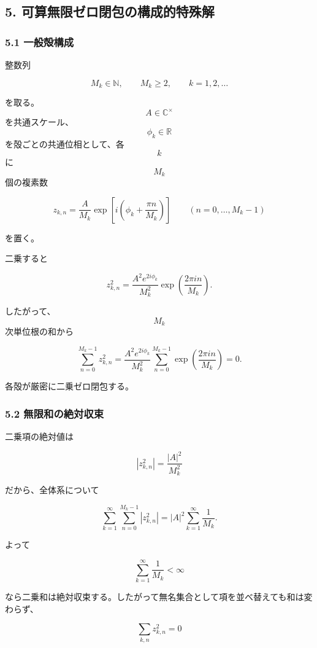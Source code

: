 \documentclass[
  a4paper,
]{ltjsarticle}
\begin{document}
\subsection{5.
可算無限ゼロ閉包の構成的特殊解}\label{ux53efux7b97ux7121ux9650ux30bcux30edux9589ux5305ux306eux69cbux6210ux7684ux7279ux6b8aux89e3}

\subsubsection{5.1 一般殻構成}\label{ux4e00ux822cux6bbbux69cbux6210}

整数列

\[
M_k\in\mathbb N,
\qquad
M_k\ge2,
\qquad
k=1,2,\ldots
\]

を取る。\[A\in\mathbb C^\times\] を共通スケール、\[\phi_k\in\mathbb R\]
を殻ごとの共通位相として、各 \[k\] に \[M_k\] 個の複素数

\[
\boxed{
z_{k,n}
=
\frac{A}{M_k}
\exp\left[i\left(\phi_k+\frac{\pi n}{M_k}\right)\right]
}
\qquad
(n=0,\ldots,M_k-1)
\tag{10}
\]

を置く。

二乗すると

\[
z_{k,n}^2
=
\frac{A^2e^{2i\phi_k}}{M_k^2}
\exp\left(\frac{2\pi i n}{M_k}\right).
\tag{11}
\]

したがって、\[M_k\] 次単位根の和から

\[
\sum_{n=0}^{M_k-1}z_{k,n}^2
=
\frac{A^2e^{2i\phi_k}}{M_k^2}
\sum_{n=0}^{M_k-1}
\exp\left(\frac{2\pi i n}{M_k}\right)
=0.
\tag{12}
\]

各殻が厳密に二乗ゼロ閉包する。

\subsubsection{5.2
無限和の絶対収束}\label{ux7121ux9650ux548cux306eux7d76ux5bfeux53ceux675f}

二乗項の絶対値は

\[
|z_{k,n}^2|
=
\frac{|A|^2}{M_k^2}
\]

だから、全体系について

\[
\sum_{k=1}^{\infty}
\sum_{n=0}^{M_k-1}|z_{k,n}^2|
=
|A|^2
\sum_{k=1}^{\infty}\frac{1}{M_k}.
\tag{13}
\]

よって

\[
\boxed{
\sum_{k=1}^{\infty}\frac{1}{M_k}<\infty
}
\tag{14}
\]

なら二乗和は絶対収束する。したがって無名集合として項を並べ替えても和は変わらず、

\[
\boxed{
\sum_{k,n}z_{k,n}^2=0
}
\tag{15}
\]
\end{document}
